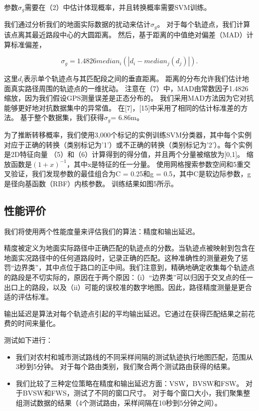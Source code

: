参数$\sigma_{g}$需要在（2）中估计体现概率，并且转换概率需要SVM训练。

我们通过分析我们的地面实际数据的扰动来估计$\sigma_{g}$。 对于每个轨迹点，我们计算该点离其最近路段中心的大圆距离。 然后，基于距离的中值绝对偏差（MAD）计算标准偏差，

\begin{equation*}
\sigma_{g}=1.4826 median_{i}(|d_{i}-median_{j}(d_{j})|).
\end{equation*}

这里$d_{i}$表示单个轨迹点与其匹配段之间的垂直距离。 距离的分布允许我们估计地面真实路径周围的轨迹点的一维扰动。 注意在（7）中，MAD由常数因子1.4826缩放，因为我们假设GPS测量误差是正态分布的。 我们采用MAD方法因为它对抗能够更好地对抗数据集中的异常值。 在[7]，[15]中采用了相同的估计标准差的方法。 基于整个数据集，我们获得$\sigma_{g}$= 6.86m。

为了推断转移概率，我们使用3,000个标记的实例训练SVM分类器，其中每个实例对应于正确的转换（类别标记为'1'）或不正确的转换（类别标记为'2'）。每个实例是2D特征向量 （5）和（6）计算得到的得分值，并且两个分量被缩放为[0,1]。 缩放函数是$(1+x)^{-1}$，其中x是特征的任一分量。 使用网格搜索参数空间和5重交叉验证，我们发现参数的最佳组合为C = 0.25和g = 0.5，其中C是软边际参数，g是径向基函数（RBF）内核参数。 训练结果如图5所示。

\subsection{性能评价}
我们将使用两个性能度量来评估我们的算法：精度和输出延迟。

精度被定义为地面实际路径中正确匹配的轨迹点的分数。当轨迹点被映射到包含在地面实况路径中的任何道路段时，记录正确的匹配。这种准确性的测量避免了惩罚“边界类”，其中点位于路口的正中间。我们注意到，精确地确定收集每个轨迹点的路段是不切实际的，原因在于两个原因：（i）“边界类”可以归因于交叉点的任一出口上的路段，以及（ii）可能的误校准的数字地图。因此，路径精度测量是更合适的评估标准。

输出延迟是算法对每个轨迹点引起的平均输出延迟。它通过在获得匹配结果之前花费的时间来量化。

测试如下进行：

\begin{itemize}

\item 我们对农村和城市测试路线的不同采样间隔的测试轨迹执行地图匹配，范围从3秒到5分钟。 对于每个路由类别，我们聚合两个测试路由获得的结果。

\item 我们比较了三种定位策略在精度和输出延迟方面：VSW，BVSW和FSW。 对于BVSW和FWS，测试了不同的窗口尺寸。 对于每个窗口大小，我们聚集整组测试数据的结果（4个测试路由，采样间隔在10秒到5分钟之间）。

\end{itemize}

